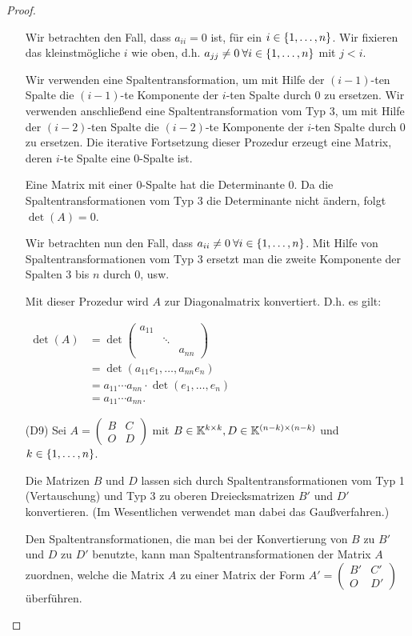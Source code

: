 \begin{proof}
\begin{itemize}
			Wir betrachten den Fall, dass $ a_{ii} = 0 $ ist, für ein $ i \in \{ 1,\ldots,n \} $. Wir fixieren das kleinstmögliche $ i $ wie oben, d.h. $ a_{jj} \neq 0 \: \forall i \in \{ 1,\ldots,n \} $ mit $ j < i $.
			
			Wir verwenden eine Spaltentransformation, um mit Hilfe der $ (i-1) $-ten Spalte die $ (i-1) $-te Komponente der $ i $-ten Spalte durch 0 zu ersetzen. Wir verwenden anschließend eine Spaltentransformation vom Typ 3, um mit Hilfe der $ (i-2) $-ten Spalte die $ (i-2) $-te Komponente der $ i $-ten Spalte durch 0 zu ersetzen. Die iterative Fortsetzung dieser Prozedur erzeugt eine Matrix, deren $ i $-te Spalte eine 0-Spalte ist.
			
			Eine Matrix mit einer 0-Spalte hat die Determinante 0. Da die Spaltentransformationen vom Typ 3 die Determinante nicht ändern, folgt $ \det(A) = 0 $.
			
			Wir betrachten nun den Fall, dass $ a_{ii} \neq 0 \: \forall i \in \{ 1,\ldots,n \} $. Mit Hilfe von Spaltentransformationen vom Typ 3 ersetzt man die zweite Komponente der Spalten 3 bis $ n $ durch 0, usw.
			
			Mit dieser Prozedur wird $ A $ zur Diagonalmatrix konvertiert. D.h. es gilt:
			
			$ \begin{aligned}
				\det(A) &= \det\begin{pmatrix}
					a_{11} && \\
					& \ddots & \\
					&& a_{nn}
				\end{pmatrix} \\
				&= \det(a_{11}e_1, \ldots, a_{nn}e_n) \\
				&= a_{11} \cdots a_{nn} \cdot \det(e_1, \ldots, e_n) \\
				&= a_{11} \cdots a_{nn}.
			\end{aligned} $
		\item[\normalfont(D9)]
			Sei $ A =
			\begin{pmatrix}
				B & C \\
				O & D
			\end{pmatrix} $
			mit $ B \in \mathbb K^{k \times k}, D \in \mathbb K^{(n-k) \times (n-k)} $ und $ k \in \{ 1,\ldots,n \} $.
			
			Die Matrizen $ B $ und $ D $ lassen sich durch Spaltentransformationen vom Typ 1 (Vertauschung) und Typ 3 zu oberen Dreiecksmatrizen $ B' $ und $ D' $ konvertieren. (Im Wesentlichen verwendet man dabei das Gaußverfahren.)
			
			Den Spaltentransformationen, die man bei der Konvertierung von $ B $ zu $ B' $ und $ D $ zu $ D' $ benutzte, kann man Spaltentransformationen der Matrix $ A $ zuordnen, welche die Matrix $ A $ zu einer Matrix der Form $ A' =
			\begin{pmatrix}
				B' & C' \\
				O & D'
			\end{pmatrix} $
			überführen.
			

\end{itemize}
\end{proof}
